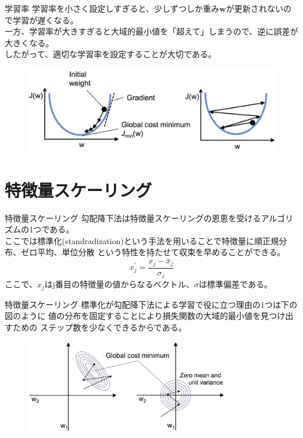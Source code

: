 \documentclass[aspectratio=169, dvipdfmx, 11pt]{beamer} %
\begin{document}
\begin{frame}{学習率}
    学習率を小さく設定しすぎると、少しずつしか重み\(\textbf{w}\)が更新されないので学習が遅くなる。 \\
    一方、学習率が大きすぎると大域的最小値を「超えて」しまうので、逆に誤差が大きくなる。\\
    したがって、適切な学習率を設定することが大切である。
    \begin{figure}[b]
        \begin{center}
        \includegraphics[width=120mm]{img/day01/fig10.png}
        \end{center}
    \end{figure}
\end{frame}

\section{特徴量スケーリング}
\begin{frame}{特徴量スケーリング}
    勾配降下法は特徴量スケーリングの恩恵を受けるアルゴリズムの1つである。 \\
    ここでは標準化(standradization)という手法を用いることで特徴量に順正規分布、ゼロ平均、単位分散
    という特性を持たせて収束を早めることができる。
    \vspace{1em}
    \begin{equation*}
        x_{j}^{'} = \frac{x_j - \bar{x} _j}{\sigma_j}
    \end{equation*}
    \vspace{1em}
    ここで、\(x_j\)はj番目の特徴量の値からなるベクトル、\(\sigma\)は標準偏差である。
\end{frame}

\begin{frame}{特徴量スケーリング}
    標準化が勾配降下法による学習で役に立つ理由の1つは下の図のように
    値の分布を固定することにより損失関数の大域的最小値を見つけ出すための
    ステップ数を少なくできるからである。
    \begin{figure}[b]
        \begin{center}
        \includegraphics[width=90mm]{img/day01/fig11.png}
        \end{center}
    \end{figure}
\end{frame}
\end{document}
